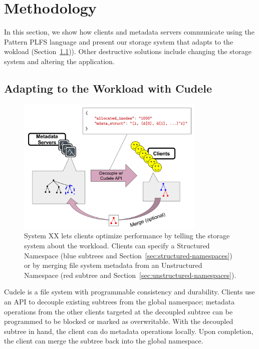 \section{Methodology}

In this section, we show how clients and metadata servers communicate using the
Pattern PLFS language and present our
storage system that adapts to the wokload
(Section~\ref{sec:adapting-to-the-workload-with-cudele})).  Other destructive
solutions include changing the storage system and altering the application.

\subsection{Adapting to the Workload with Cudele}
\label{sec:adapting-to-the-workload-with-cudele}

\begin{figure}[tb]
\centering
  \includegraphics[width=90mm]{figures/arch.png} 
  \caption{System XX lets clients optimize performance by telling the storage
  system about the workload. Clients can specify a Structured Namespace (blue
  subtrees and Section~\ref{sec:structured-namespaces}) or by merging file system
  metadata from an Unstructured Namespace (red subtree and
  Section~\ref{sec:unstructured-namespaces}).}\label{fig:arch}
\end{figure}

Cudele is a file system with programmable consistency and durability. Clients
use an API to decouple existing subtrees from the global namespace; metadata
operations from the other clients targeted at the decoupled subtree can be
programmed to be blocked or marked as overwritable. With the decoupled subtree
in hand, the client can do metadata operations locally. Upon completion, the
client can merge the subtree back into the global namespace. 

